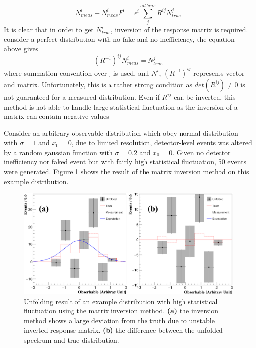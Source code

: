 \documentclass[12pt]{article}
\begin{document}
            $$N_{meas}^i  - N_{meas}^i F^{i} = {\epsilon^{i}}\sum_{j}^{all\ bins}R^{ij} N_{true}^j$$
            It is clear that in order to get $N_{true}^i$, inversion of the response matrix is required.
            consider a perfect distribution with no fake and no inefficiency, the equation above gives
            $$(R^{-1})^{ij}N^i_{meas} = N^j_{true}$$
            where summation convention over j is used, and $N^{i}$, $(R^{-1})^{ij}$ represents vector and matrix.
            Unfortunately, this is a rather strong condition as $det(R^{ij})\neq0$ is not guaranteed for a measured distribution.
            Even if $R^{ij}$ can be inverted, this method is not able to handle large statistical fluctuation as the inversion 
            of a matrix can contain negative values. 
            \par Consider an arbitrary observable distribution which obey normal distribution with 
            $\sigma=1$ and $x_0 = 0$, due to limited resolution,  detector-level events was altered by a random gaussian function with 
            $\sigma=0.2$ and $x_0 = 0$. Given no detector inefficiency nor faked event but with fairly high statistical fluctuation, 50 events were generated. 
            Figure \ref{fig:demounfreverse} shows the result of the matrix inversion method on this example distribution.
            \begin{figure}[ht]
                \begin{centering}
                \includegraphics[scale=0.23]{ps/unfold_demo.png}
                \caption{Unfolding result of an example distribution with high statistical fluctuation using the matrix inversion method.
                \textbf{(a)} the inversion method shows a large deviation from the truth due to unstable inverted response matrix. \textbf{(b)} the difference between the unfolded spectrum and true distribution.}
                \label{fig:demounfreverse}
                \end{centering}
            \end{figure}
\end{document}
